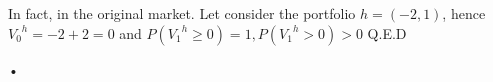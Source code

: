 \documentclass[12pt]{article}
\begin{document}
\begin{enumerate}
\begin{itemize}
In fact, in the original market. Let consider the portfolio $h= (-2,1)$, hence ${V_{0}}^{h}= -2+2 = 0$ and $P({V_{1}}^{h} \geq 0) = 1, P({V_{1}}^{h} >0) >0$ Q.E.D
 


\end{itemize}•



































\end{enumerate}
\end{document}
